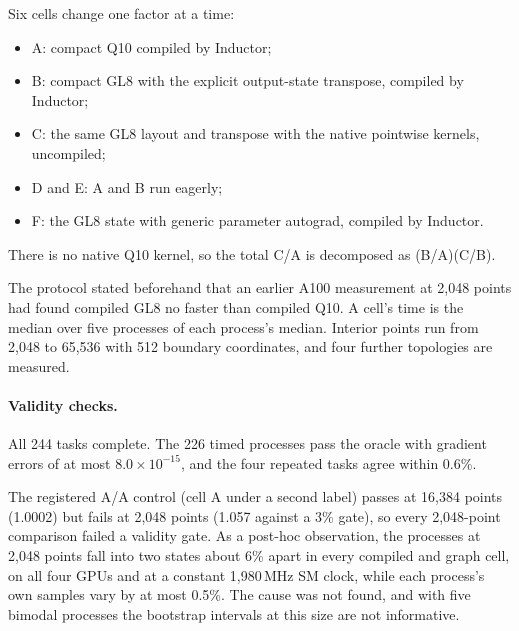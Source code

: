 \documentclass[11pt]{article}
\begin{document}
Six cells change one factor at a time:
\begin{itemize}
\item A: compact Q10 compiled by Inductor;
\item B: compact GL8 with the explicit output-state transpose, compiled by
  Inductor;
\item C: the same GL8 layout and transpose with the native pointwise
  kernels, uncompiled;
\item D and E: A and B run eagerly;
\item F: the GL8 state with generic parameter autograd, compiled by Inductor.
\end{itemize}
There is no native Q10 kernel, so the total C/A is decomposed as
(B/A)(C/B).

The protocol stated beforehand that an earlier A100 measurement at 2,048
points had found compiled GL8 no faster than compiled Q10. A cell's time is
the median over five processes of each process's median. Interior points
run from 2,048 to 65,536 with 512 boundary coordinates, and four further
topologies are measured.

\paragraph{Validity checks.}
All 244 tasks complete. The 226 timed processes pass the oracle with
gradient errors of at most $8.0\times10^{-15}$, and the four repeated tasks
agree within 0.6\%.

The registered A/A control (cell A under a second label) passes at 16,384
points (1.0002) but fails at 2,048 points (1.057 against a 3\% gate), so
every 2,048-point comparison failed a validity gate. As a post-hoc
observation, the processes at 2,048 points fall into two states about 6\%
apart in every compiled and graph cell, on all four GPUs and at a constant
1,980\,MHz SM clock, while each process's own samples vary by at most
0.5\%. The cause was not found, and with five bimodal processes the
bootstrap intervals at this size are not informative.
\end{document}
